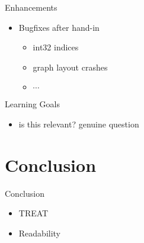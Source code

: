 \begin{frame}{Enhancements}
    \begin{itemize}
        \item Bugfixes after hand-in
              \begin{itemize}
                  \item int32 indices
                  \item graph layout crashes
                  \item $\cdots$
              \end{itemize}
    \end{itemize}

\end{frame}
\begin{frame}{Learning Goals}
    \begin{itemize}
        \item is this relevant? genuine question
    \end{itemize}
\end{frame}
\section{Conclusion}
\begin{frame}{Conclusion}
    \begin{itemize}
        \item TREAT
        \item Readability
    \end{itemize}
\end{frame}